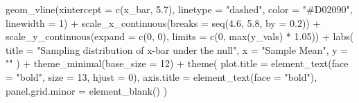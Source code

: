 \documentclass[
  letterpaper,
  DIV=11,
  numbers=noendperiod]{scrreprt}
\newenvironment{Shaded}{\begin{snugshade}}{\end{snugshade}}
\newcommand{\AttributeTok}[1]{\textcolor[rgb]{0.40,0.45,0.13}{#1}}
\newcommand{\DecValTok}[1]{\textcolor[rgb]{0.68,0.00,0.00}{#1}}
\newcommand{\FloatTok}[1]{\textcolor[rgb]{0.68,0.00,0.00}{#1}}
\newcommand{\FunctionTok}[1]{\textcolor[rgb]{0.28,0.35,0.67}{#1}}
\newcommand{\NormalTok}[1]{\textcolor[rgb]{0.00,0.23,0.31}{#1}}
\newcommand{\SpecialCharTok}[1]{\textcolor[rgb]{0.37,0.37,0.37}{#1}}
\newcommand{\StringTok}[1]{\textcolor[rgb]{0.13,0.47,0.30}{#1}}
\begin{document}
\begin{Shaded}
\begin{Highlighting}[]
  \FunctionTok{geom\_vline}\NormalTok{(}\AttributeTok{xintercept =} \FunctionTok{c}\NormalTok{(x\_bar, }\FloatTok{5.7}\NormalTok{), }\AttributeTok{linetype =} \StringTok{"dashed"}\NormalTok{, }
             \AttributeTok{color =} \StringTok{"\#D02090"}\NormalTok{, }\AttributeTok{linewidth =} \DecValTok{1}\NormalTok{) }\SpecialCharTok{+}
  \FunctionTok{scale\_x\_continuous}\NormalTok{(}\AttributeTok{breaks =} \FunctionTok{seq}\NormalTok{(}\FloatTok{4.6}\NormalTok{, }\FloatTok{5.8}\NormalTok{, }\AttributeTok{by =} \FloatTok{0.2}\NormalTok{)) }\SpecialCharTok{+}
  \FunctionTok{scale\_y\_continuous}\NormalTok{(}\AttributeTok{expand =} \FunctionTok{c}\NormalTok{(}\DecValTok{0}\NormalTok{, }\DecValTok{0}\NormalTok{), }\AttributeTok{limits =} \FunctionTok{c}\NormalTok{(}\DecValTok{0}\NormalTok{, }\FunctionTok{max}\NormalTok{(y\_vals) }\SpecialCharTok{*} \FloatTok{1.05}\NormalTok{)) }\SpecialCharTok{+}
  \FunctionTok{labs}\NormalTok{(}
    \AttributeTok{title =} \StringTok{"Sampling distribution of x{-}bar under the null"}\NormalTok{,}
    \AttributeTok{x =} \StringTok{"Sample Mean"}\NormalTok{,}
    \AttributeTok{y =} \StringTok{""}
\NormalTok{  ) }\SpecialCharTok{+}
  \FunctionTok{theme\_minimal}\NormalTok{(}\AttributeTok{base\_size =} \DecValTok{12}\NormalTok{) }\SpecialCharTok{+}
  \FunctionTok{theme}\NormalTok{(}
    \AttributeTok{plot.title =} \FunctionTok{element\_text}\NormalTok{(}\AttributeTok{face =} \StringTok{"bold"}\NormalTok{, }\AttributeTok{size =} \DecValTok{13}\NormalTok{, }\AttributeTok{hjust =} \DecValTok{0}\NormalTok{),}
    \AttributeTok{axis.title =} \FunctionTok{element\_text}\NormalTok{(}\AttributeTok{face =} \StringTok{"bold"}\NormalTok{),}
    \AttributeTok{panel.grid.minor =} \FunctionTok{element\_blank}\NormalTok{()}
\NormalTok{  )}


\end{Highlighting}
\end{Shaded}
\end{document}

